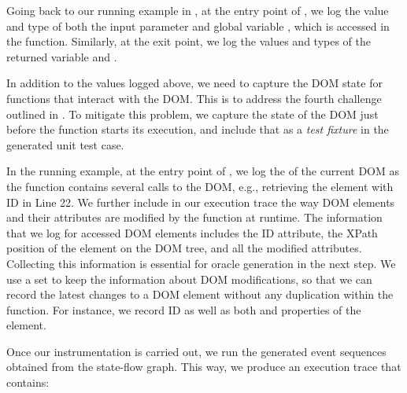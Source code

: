 Going back to our running example in , at the entry point of , we log the value and type of both the input parameter  and global variable , which is accessed in the function. Similarly, at the exit point, we log the values and types of the returned variable  and .

In addition to the values logged above, we need to capture the DOM state for functions that interact with the DOM. This is to address the fourth challenge outlined in .
To mitigate this problem, we capture the state of the DOM just before the function starts its execution, and include that as a \emph{test fixture} \cite{quint} in the generated unit test case.

In the running example, at the entry point of  , we log the  of the current DOM as the function contains several calls to the DOM, e.g., retrieving the element with ID  in Line 22. We further include in our execution trace the way DOM elements and their attributes are modified by the \javascript function at runtime. 
The information that we log for accessed DOM elements includes the ID attribute, the XPath position of the element on the DOM tree, and all the modified  attributes. Collecting this information is essential for oracle generation in the next step.
%
We use a set to keep the information about DOM modifications, so that we can record the latest changes to a DOM element without any duplication within the function. 
For instance, we record ID as well as both  and  properties of the  element. 

Once our instrumentation is carried out, we run the generated event sequences obtained from the state-flow graph. This way, we produce an execution trace that contains:
 
